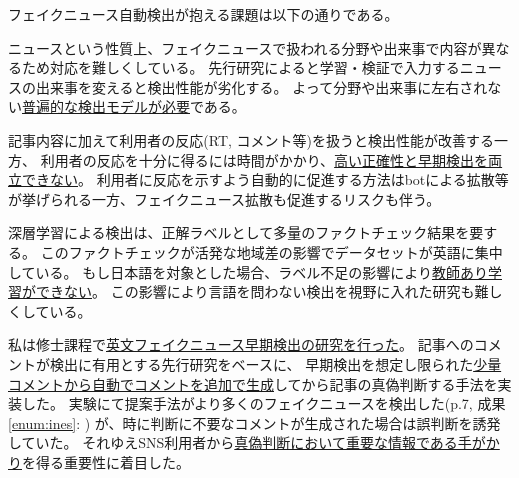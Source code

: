 フェイクニュース自動検出が抱える課題は以下の通りである。
\vspace{-3mm}
\begin{description}
    \setlength{\parskip}{0cm}
    \setlength{\itemsep}{0cm}
    \item[分野や出来事による特異性] %
        ニュースという性質上、フェイクニュースで扱われる分野や出来事で内容が異なるため対応を難しくしている。
        先行研究によると学習・検証で入力するニュースの出来事を変えると検出性能が劣化する\cite{Wang:2018:EEA:3219819.3219903}。
        よって分野や出来事に左右されない\underline{普遍的な検出モデルが必要}である。
    \item[早期検出と正確性の両立] %
        記事内容に加えて利用者の反応(RT, コメント等)を扱うと検出性能が改善する\cite{Wu:2018:TFF:3159652.3159677}一方、
        利用者の反応を十分に得るには時間がかかり、\underline{高い正確性と早期検出を両立できない}。
        利用者に反応を示すよう自動的に促進する方法はbotによる拡散等が挙げられる一方、フェイクニュース拡散も促進するリスクも伴う。
    \item[日本語データセット不足] %
        深層学習による検出は、正解ラベルとして多量のファクトチェック結果を要する。
        このファクトチェックが活発な地域差の影響でデータセットが英語に集中\cite{fakenewsnet}している。
        もし日本語を対象とした場合、ラベル不足の影響により\underline{教師あり学習ができない}。
        この影響により言語を問わない検出を視野に入れた研究も難しくしている。
    \end{description}

私は修士課程で\underline{英文フェイクニュース早期検出の研究を行った}。
記事へのコメントが検出に有用とする先行研究\cite{defend}をベースに、
早期検出を想定し限られた\underline{少量コメントから自動でコメントを追加で生成}してから記事の真偽判断する手法を実装した。
実験にて提案手法がより多くのフェイクニュースを検出した(p.7, 成果\ref{enum:ines}: \cite{ines})
が、時に判断に不要なコメントが生成された場合は誤判断を誘発していた。
それゆえSNS利用者から\underline{真偽判断において重要な情報である手がかり}を得る重要性に着目した。

